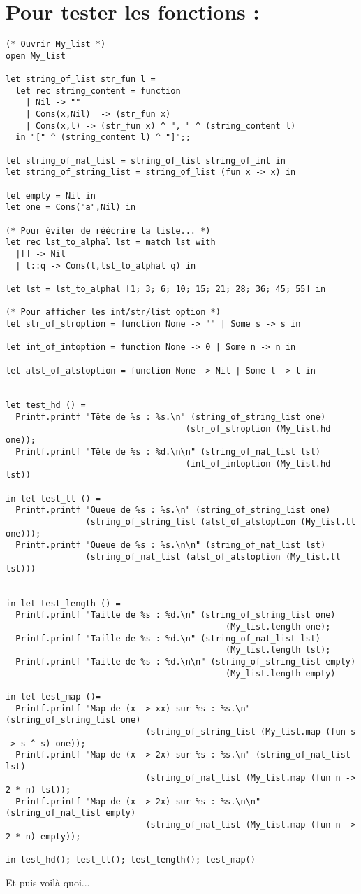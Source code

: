 \documentclass{article}
\begin{document}
\section{Pour tester les fonctions :}
\begin{verbatim}
(* Ouvrir My_list *)
open My_list

let string_of_list str_fun l = 
  let rec string_content = function
    | Nil -> ""
    | Cons(x,Nil)  -> (str_fun x)
    | Cons(x,l) -> (str_fun x) ^ ", " ^ (string_content l) 
  in "[" ^ (string_content l) ^ "]";;

let string_of_nat_list = string_of_list string_of_int in
let string_of_string_list = string_of_list (fun x -> x) in

let empty = Nil in
let one = Cons("a",Nil) in

(* Pour éviter de réécrire la liste... *)
let rec lst_to_alphal lst = match lst with
  |[] -> Nil
  | t::q -> Cons(t,lst_to_alphal q) in

let lst = lst_to_alphal [1; 3; 6; 10; 15; 21; 28; 36; 45; 55] in

(* Pour afficher les int/str/list option *)
let str_of_stroption = function None -> "" | Some s -> s in

let int_of_intoption = function None -> 0 | Some n -> n in

let alst_of_alstoption = function None -> Nil | Some l -> l in


let test_hd () = 
  Printf.printf "Tête de %s : %s.\n" (string_of_string_list one) 
                                    (str_of_stroption (My_list.hd one));
  Printf.printf "Tête de %s : %d.\n\n" (string_of_nat_list lst) 
                                    (int_of_intoption (My_list.hd lst))

in let test_tl () = 
  Printf.printf "Queue de %s : %s.\n" (string_of_string_list one) 
                (string_of_string_list (alst_of_alstoption (My_list.tl one)));
  Printf.printf "Queue de %s : %s.\n\n" (string_of_nat_list lst) 
                (string_of_nat_list (alst_of_alstoption (My_list.tl lst)))


in let test_length () = 
  Printf.printf "Taille de %s : %d.\n" (string_of_string_list one) 
                                            (My_list.length one);
  Printf.printf "Taille de %s : %d.\n" (string_of_nat_list lst) 
                                            (My_list.length lst);
  Printf.printf "Taille de %s : %d.\n\n" (string_of_string_list empty) 
                                            (My_list.length empty)

in let test_map ()= 
  Printf.printf "Map de (x -> xx) sur %s : %s.\n" (string_of_string_list one) 
                            (string_of_string_list (My_list.map (fun s -> s ^ s) one));
  Printf.printf "Map de (x -> 2x) sur %s : %s.\n" (string_of_nat_list lst) 
                            (string_of_nat_list (My_list.map (fun n -> 2 * n) lst));
  Printf.printf "Map de (x -> 2x) sur %s : %s.\n\n" (string_of_nat_list empty) 
                            (string_of_nat_list (My_list.map (fun n -> 2 * n) empty));

in test_hd(); test_tl(); test_length(); test_map()

\end{verbatim}


\noindent Et puis voilà quoi...
\end{document}
